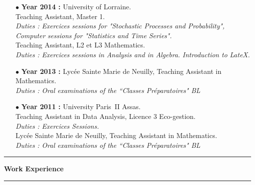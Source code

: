\documentclass[a4paper,11pt]{article}
\newcommand{\titre}[1]{%
	\begin{center}
	\bigskip
	\rule{\textwidth}{1pt}
	\par\vspace{0.1cm}
        \textbf{\large #1}
	\par\rule{\textwidth}{1pt}
	\end{center}
	\bigskip
	}
\begin{document}
\begin{itemize}
\item[$\bullet$] \textbf{ Year 2014 :}  University of Lorraine.\\
					Teaching Assistant, Master 1. \\
					\textit{Duties : Exercices sessions for "Stochastic Processes and Probability", Computer sessions for "Statistics and Time Series".}\\
					Teaching Assistant, L2 et L3 Mathematics. \\
					\textit{Duties : Exercices sessions in Analysis and in Algebra. Introduction to LateX.}\\
\item[$\bullet$] \textbf{ Year 2013 :} Lycée Sainte Marie de Neuilly, Teaching Assistant in Mathematics. \\
					\textit{Duties : Oral examinations of the ``Classes Préparatoires" BL} \\
\item[$\bullet$] \textbf{ Year 2011 :} University Paris~II Assas.\\
					Teaching Assistant in Data Analysis, Licence 3 Eco-gestion.\\
					\textit{Duties : Exercices Sessions.}\\
					Lycée Sainte Marie de Neuilly, Teaching Assistant in Mathematics. \\
					\textit{Duties : Oral examinations of the ``Classes Préparatoires" BL} 
\end{itemize}

\newpage
\titre{Work Experience}
\end{document}
